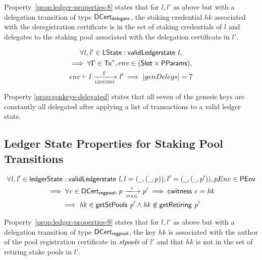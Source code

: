 Property~\ref{prop:ledger-properties-8} states that for $l, l'$ as above but
with a delegation transition of type $\mathsf{DCert_{delegate}}$, the staking credential $hk$
associated with the deregistration certificate is in the set of staking
credentials of $l$ and delegates to the staking pool associated with the
delegation certificate in $l'$.

\begin{property}
  \label{prop:genkeys-delegated}
  \begin{multline*}
    \forall \var{l}, \var{l'} \in \LState: \applyFun{validLedgerstate}{l},\\
    \implies \forall \Gamma \in \seqof{\Tx}, env \in (\Slot \times \PParams), \\
    env \vdash\var{l} \trans{ledgers}{\Gamma} \var{l'} \implies |genDelegs| = 7
  \end{multline*}
\end{property}

Property \ref{prop:genkeys-delegated} states that all seven of the genesis keys
are constantly all delegated after applying a list of transactions to a valid ledger
state.

\subsection{Ledger State Properties for Staking Pool Transitions}
\label{sec:ledg-state-prop}

\begin{property}
  \begin{multline*}
    \forall \var{l}, \var{l'} \in \ledgerState: \applyFun{validLedgerstate}{l},
    l = (\wcard, (\wcard, p)), l' = (\wcard, (\wcard, p')), pEnv\in\PEnv \\
    \implies \forall \var{c} \in \DCertRegPool, \var{p} \trans{pool}{c} \var{p'}
    \implies \applyFun{cwitness}{c} = \var{hk}\\ \implies
    \var{hk}\in\applyFun{getStPools}{p'} \wedge \var{hk} \not\in
    \applyFun{getRetiring}{p'}
  \end{multline*}
  \label{prop:ledger-properties-9}
\end{property}

Property~\ref{prop:ledger-properties-9} states that for $l, l'$ as above but
with a delegation transition of type $\mathsf{DCert_{regpool}}$, the key $hk$ is associated
with the author of the pool registration certificate in $\mathit{stpools}$ of $l'$
and that $hk$ is not in the set of retiring stake pools in $l'$.

